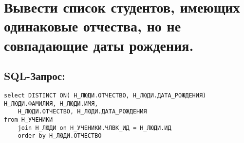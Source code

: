 \newpage
\section{Вывести список студентов, имеющих одинаковые отчества, но не совпадающие даты рождения.}

\subsection{SQL-Запрос:}
\begin{verbatim}
select DISTINCT ON( Н_ЛЮДИ.ОТЧЕСТВО, Н_ЛЮДИ.ДАТА_РОЖДЕНИЯ) Н_ЛЮДИ.ФАМИЛИЯ, Н_ЛЮДИ.ИМЯ,
    Н_ЛЮДИ.ОТЧЕСТВО, Н_ЛЮДИ.ДАТА_РОЖДЕНИЯ
from Н_УЧЕНИКИ
    join Н_ЛЮДИ on Н_УЧЕНИКИ.ЧЛВК_ИД = Н_ЛЮДИ.ИД
    order by Н_ЛЮДИ.ОТЧЕСТВО
\end{verbatim}